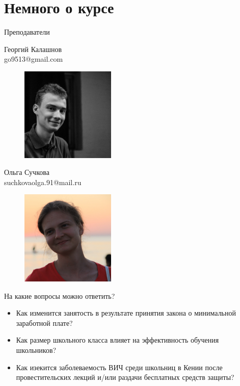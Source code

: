 \section{Немного о курсе}

\begin{frame}{Преподаватели}
\begin{multicols}{2}

Георгий Калашнов \\
go9513@gmail.com
\begin{figure}
    \centering
    \includegraphics[width=0.4\textwidth]{Gosha.jpg}
\end{figure}


Ольга Сучкова \\
suchkovaolga.91@mail.ru
\begin{figure}
    \centering
    \includegraphics[width=0.4\textwidth]{Olya.jpg}
    
\end{figure}
\end{multicols}


\end{frame}



\begin{frame}{На какие вопросы можно ответить?}

\begin{itemize}
        \item Как изменится занятость в результате
принятия закона о минимальной заработной плате?
        \item Как размер школьного класса влияет на
эффективность обучения школьников?
        \item Как изекится заболеваемость ВИЧ среди школьниц в Кении после провестительских лекций и/или раздачи бесплатных средств защиты?
\end{itemize}



\end{frame}


